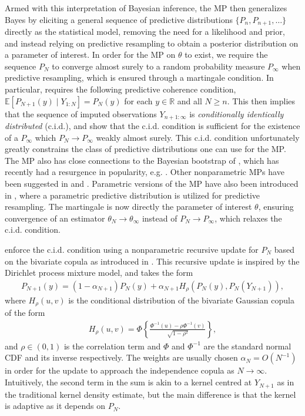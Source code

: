 \documentclass[11pt,a4paper]{article}
\newcommand{\R}{\mathbb{R}}
\newcommand{\E}{\mathbb{E}}
\begin{document}
Armed with this interpretation of Bayesian inference, the MP then generalizes Bayes by eliciting a general sequence of predictive distributions $\{P_n,P_{n+1},\ldots\}$ directly as the statistical model, removing the need for a likelihood and prior, and instead relying on predictive resampling to obtain a posterior distribution on a parameter of interest. In order for the MP on $\theta$ to exist, we require the sequence $P_N$ to converge almost surely to a random probability measure $P_\infty$ when predictive resampling, which is ensured through a martingale condition. In particular, \cite{Fong2023a} requires the following predictive coherence condition, $\E\left[P_{N+1}(y) \mid Y_{1:N}\right] = P_N(y)$
for each $y \in \R$ and all $N \geq n$. 
This then implies that the sequence of imputed observations $Y_{n+1:\infty}$ is \textit{conditionally identically distributed} (c.i.d.), and \cite{Berti2004} show that the c.i.d. condition is sufficient for the existence of a $P_\infty$ which $P_N \to P_\infty$ weakly almost surely. This c.i.d. condition unfortunately greatly constrains the class of predictive distributions one can use for the MP. The MP also has close connections to the Bayesian bootstrap of \cite{Rubin1981}, which has recently had a resurgence in popularity, e.g. \cite{Fong2019a, Nie2023}. Other nonparametric MPs have been suggested in \cite{Cui2023,Cui2024} and \cite{Walker2024}. Parametric versions of the MP have also been introduced in \cite{Walker2022,Holmes2023}, where a  parametric predictive distribution is utilized for predictive resampling. The martingale is now directly the parameter of interest $\theta$, ensuring convergence of an estimator $\theta_N \to \theta_\infty$ instead of $P_N \to P_\infty$, which relaxes the c.i.d. condition.

\cite{Fong2023a} enforce the c.i.d. condition using a nonparametric recursive update for $P_N$ based on the bivariate copula as introduced in \cite{Hahn2018}. This recursive update is inspired by the Dirichlet process mixture model, and takes the form
\begin{align}\label{eq:copula_update}
    P_{N+1}(y) = (1-\alpha_{N+1})P_N(y) + \alpha_{N+1}H_\rho\left(P_N(y), P_N(Y_{N+1})\right),
\end{align}
where $H_\rho(u,v)$ is the conditional distribution of the bivariate Gaussian copula of the form
\begin{align}\label{eq:condit_copula}
H_\rho(u,v) = \Phi\left\{\frac{\Phi^{-1}\left(u\right) - \rho \Phi^{-1}(v)}{\sqrt{1-\rho^2}}\right\},
\end{align}
and  $\rho \in (0,1)$ is the correlation term and $\Phi$ and $\Phi^{-1}$ are the standard normal CDF and its inverse respectively. The weights are usually chosen $\alpha_{N} = O(N^{-1})$ in order for the update to approach the independence copula as $N \to \infty$. Intuitively, the second term in the sum is akin to a kernel centred at $Y_{N+1}$ as in the traditional kernel density estimate, but the main difference is that the kernel is adaptive as it depends on $P_N$. 
\end{document}
